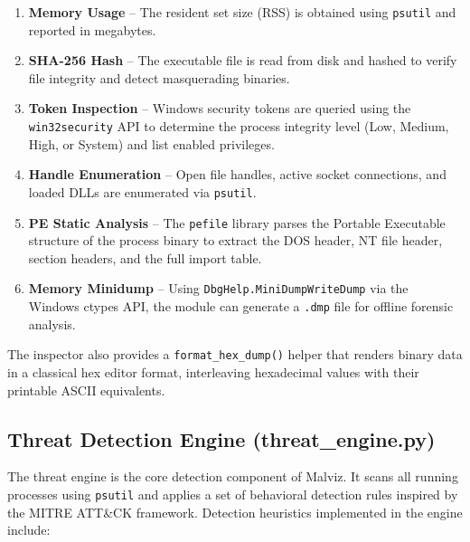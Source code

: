 \begin{enumerate}
    \item \textbf{Memory Usage} -- The resident set size (RSS) is obtained using \texttt{psutil} and reported in megabytes.
    \item \textbf{SHA-256 Hash} -- The executable file is read from disk and hashed to verify file integrity and detect masquerading binaries.
    \item \textbf{Token Inspection} -- Windows security tokens are queried using the \texttt{win32security} API to determine the process integrity level (Low, Medium, High, or System) and list enabled privileges.
    \item \textbf{Handle Enumeration} -- Open file handles, active socket connections, and loaded DLLs are enumerated via \texttt{psutil}.
    \item \textbf{PE Static Analysis} -- The \texttt{pefile} library parses the Portable Executable structure of the process binary to extract the DOS header, NT file header, section headers, and the full import table.
    \item \textbf{Memory Minidump} -- Using \texttt{DbgHelp.MiniDumpWriteDump} via the Windows ctypes API, the module can generate a \texttt{.dmp} file for offline forensic analysis.
\end{enumerate}

The inspector also provides a \texttt{format\_hex\_dump()} helper that renders binary data in a classical hex editor format, interleaving hexadecimal values with their printable ASCII equivalents.

\subsection{Threat Detection Engine (threat\_engine.py)}

The threat engine is the core detection component of Malviz. It scans all running processes using \texttt{psutil} and applies a set of behavioral detection rules inspired by the MITRE ATT\&CK framework. Detection heuristics implemented in the engine include:

